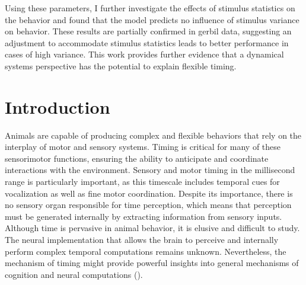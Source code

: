 \documentclass[10pt]{article}
\begin{document}
Using these parameters, I further investigate the effects of stimulus statistics on the behavior and found that the model predicts no influence of stimulus variance on behavior. 
These results are partially confirmed in gerbil data, suggesting an adjustment to accommodate stimulus statistics leads to better performance in cases of high variance. 
This work provides further evidence that a dynamical systems perspective has the potential to explain flexible timing.



\pagebreak

\tableofcontents

\pagebreak

\section{Introduction}
Animals are capable of producing complex and flexible behaviors that rely on the interplay of motor and sensory systems.
Timing is critical for many of these sensorimotor functions, ensuring the ability to anticipate and coordinate interactions with the environment.
Sensory and motor timing in the millisecond range is particularly important, as this timescale includes temporal cues for vocalization as well as fine motor coordination.
Despite its importance, there is no sensory organ responsible for time perception, which means that perception must be generated internally by extracting information from sensory inputs.
Although time is pervasive in animal behavior, it is elusive and difficult to study. The neural implementation that allows the brain to perceive and internally perform complex temporal computations remains unknown.
Nevertheless, the mechanism of timing might provide powerful insights into general mechanisms of cognition and neural computations (\cite{Issa2020}).
\end{document}
